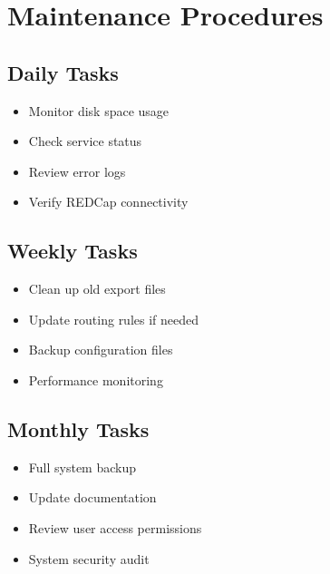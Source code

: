 \documentclass[letterpaper,10pt,english]{sphinxmanual}
\begin{document}
\section{Maintenance Procedures}
\label{\detokenize{Temp/admin-options:maintenance-procedures}}

\subsection{Daily Tasks}
\label{\detokenize{Temp/admin-options:daily-tasks}}\begin{itemize}
\item {} 
\sphinxAtStartPar
Monitor disk space usage

\item {} 
\sphinxAtStartPar
Check service status

\item {} 
\sphinxAtStartPar
Review error logs

\item {} 
\sphinxAtStartPar
Verify REDCap connectivity

\end{itemize}


\subsection{Weekly Tasks}
\label{\detokenize{Temp/admin-options:weekly-tasks}}\begin{itemize}
\item {} 
\sphinxAtStartPar
Clean up old export files

\item {} 
\sphinxAtStartPar
Update routing rules if needed

\item {} 
\sphinxAtStartPar
Backup configuration files

\item {} 
\sphinxAtStartPar
Performance monitoring

\end{itemize}


\subsection{Monthly Tasks}
\label{\detokenize{Temp/admin-options:monthly-tasks}}\begin{itemize}
\item {} 
\sphinxAtStartPar
Full system backup

\item {} 
\sphinxAtStartPar
Update documentation

\item {} 
\sphinxAtStartPar
Review user access permissions

\item {} 
\sphinxAtStartPar
System security audit

\end{itemize}
\end{document}
